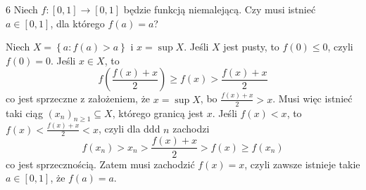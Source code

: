 \documentclass{../note}
\begin{document}
\begin{zadanie}{6}
Niech $f:[0,1]\rightarrow[0,1]$ będzie funkcją niemalejącą. Czy musi istnieć $a\in[0,1]$, dla którego $f(a)=a$?
\end{zadanie}
\begin{rozwiazanie}
Niech $X = \left\{a : f(a) > a\right\}$ i $x = \sup X$. Jeśli $X$ jest pusty, to $f(0) \leq 0$, czyli $f(0) = 0$. Jeśli $x \in X$, to 
\[f\left(\frac{f(x)+x}{2}\right) \geq f(x) > \frac{f(x)+x}{2}\]
co jest sprzeczne z założeniem, że $x = \sup X$, bo $\frac{f(x)+x}{2} > x$. Musi więc istnieć taki ciąg $(x_n)_{n\geq1} \subseteq X$, którego granicą jest $x$. Jeśli $f(x) < x$, to $f(x) < \frac{f(x)+x}{2} < x$, czyli dla ddd $n$ zachodzi 
\[f(x_n) > x_n > \frac{f(x)+x}{2} > f(x) \geq f(x_n)\]
co jest sprzecznością. Zatem musi zachodzić $f(x) = x$, czyli zawsze istnieje takie $a \in [0, 1]$, że $f(a) = a$.
\end{rozwiazanie}
\end{document}
